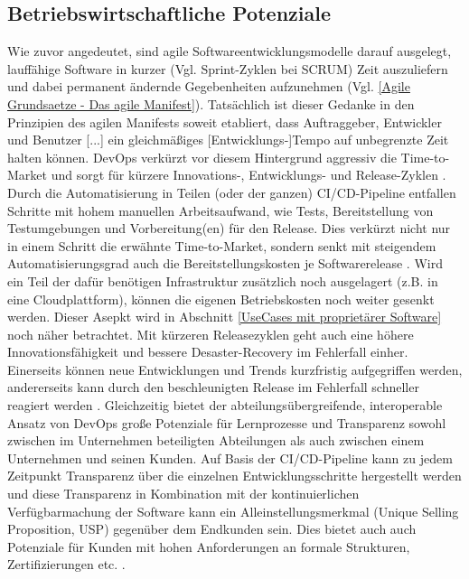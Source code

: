 \subsection{Betriebswirtschaftliche Potenziale}
\label{Betriebswirtschaftliche Potenziale}
Wie zuvor angedeutet, sind agile Softwareentwicklungsmodelle darauf ausgelegt, lauffähige Software in kurzer (Vgl. Sprint-Zyklen bei \gls{SCRUM}) Zeit auszuliefern und dabei permanent ändernde Gegebenheiten aufzunehmen (Vgl. \ref{Agile Grundsaetze - Das agile Manifest}). Tatsächlich ist dieser Gedanke in den Prinzipien des agilen Manifests soweit etabliert, dass \glqq Auftraggeber, Entwickler und Benutzer [...] ein gleichmäßiges [Entwicklungs-]Tempo auf unbegrenzte Zeit halten können\grqq \cite{beck_prinzipien_2001}.\newline
\gls{DevOps} verkürzt vor diesem Hintergrund aggressiv die \gls{Time-to-Market} und sorgt für kürzere Innovations-, Entwicklungs- und Release-Zyklen \cite{forsgren_devops_2015}. Durch die Automatisierung in Teilen (oder der ganzen) \acrshort{CI}/\acrshort{CD}-Pipeline entfallen Schritte mit hohem manuellen Arbeitsaufwand, wie Tests, Bereitstellung von Testumgebungen und Vorbereitung(en) für den Release. Dies verkürzt nicht nur in einem Schritt die erwähnte \gls{Time-to-Market}, sondern senkt mit steigendem Automatisierungsgrad auch die Bereitstellungskosten je Softwarerelease \cite{forsgren_devops_2015}.
Wird ein Teil der dafür benötigen Infrastruktur zusätzlich noch ausgelagert (z.B. in eine Cloudplattform), können die eigenen Betriebskosten noch weiter gesenkt werden. Dieser Asepkt wird in Abschnitt \ref{UseCases mit proprietärer Software} noch näher betrachtet.\newline
Mit kürzeren Releasezyklen geht auch eine höhere Innovationsfähigkeit und bessere Desaster-Recovery im Fehlerfall einher. Einerseits können neue Entwicklungen und Trends kurzfristig aufgegriffen werden, andererseits kann durch den beschleunigten Release im Fehlerfall schneller reagiert werden \cite{forsgren_devops_2015}.
Gleichzeitig bietet der abteilungsübergreifende, interoperable Ansatz von \gls{DevOps} große Potenziale für Lernprozesse und Transparenz sowohl zwischen im Unternehmen beteiligten Abteilungen als auch zwischen einem Unternehmen und seinen Kunden.
Auf Basis der \acrshort{CI}/\acrshort{CD}-Pipeline kann zu jedem Zeitpunkt Transparenz über die einzelnen Entwicklungsschritte hergestellt werden und diese Transparenz in Kombination mit der kontinuierlichen Verfügbarmachung der Software kann ein Alleinstellungsmerkmal (Unique Selling Proposition, \acrshort{USP}) gegenüber dem Endkunden sein. Dies bietet auch auch Potenziale für Kunden mit hohen Anforderungen an formale Strukturen, Zertifizierungen etc. \cite[Kap. 7.2]{leite_survey_2020}.